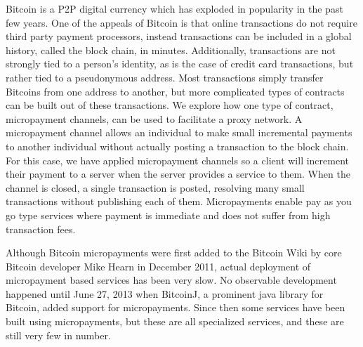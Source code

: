 Bitcoin is a P2P digital currency which has exploded in popularity in the past few years. One of the appeals of Bitcoin is that online transactions do not require third party payment processors, instead transactions can be included in a global history, called the block chain, in minutes. Additionally, transactions are not strongly tied to a person's identity, as is the case of credit card transactions, but rather tied to a pseudonymous address. Most transactions simply transfer Bitcoins from one address to another, but more complicated types of contracts can be built out of these transactions. We explore how one type of contract, micropayment channels, can be used to facilitate a proxy network. A micropayment channel allows an individual to make small incremental payments to another individual without actually posting a transaction to the block chain. For this case, we have applied micropayment channels so a client will increment their payment to a server when the server provides a service to them. When the channel is closed, a single transaction is posted, resolving many small transactions without publishing each of them. Micropayments enable pay as you go type services where payment is immediate and does not suffer from high transaction fees.

Although Bitcoin micropayments were first added to the Bitcoin Wiki by core Bitcoin developer Mike Hearn in December 2011,  actual deployment of micropayment based services has been very slow. No observable development happened until June 27, 2013 when BitcoinJ, a prominent java library for Bitcoin, added support for micropayments. Since then some services have been built using micropayments, but these are all specialized services, and these are still very few in number.